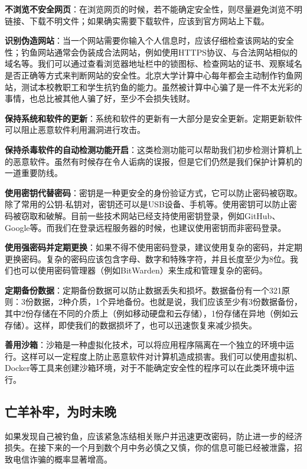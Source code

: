 \documentclass[../main.tex]{subfiles}
\begin{document}
\textbf{不浏览不安全网页}：在浏览网页的时候，若不能确定安全性，则尽量避免浏览不明链接、下载不明文件；如果确实需要下载软件，应该到官方网站上下载。

\textbf{识别伪造网站}：当一个网站需要你输入个人信息时，应该仔细检查该网站的安全性；钓鱼网站通常会伪装成合法网站，例如使用HTTPS协议、与合法网站相似的域名等。我们可以通过查看浏览器地址栏中的锁图标、检查网站的证书、观察域名是否正确等方式来判断网站的安全性。北京大学计算中心每年都会主动制作钓鱼网站，测试本校教职工和学生抗钓鱼的能力。虽然被计算中心骗了是一件不太光彩的事情，也总比被其他人骗了好，至少不会损失钱财。

\textbf{保持系统和软件的更新}：系统和软件的更新有一大部分是安全更新。定期更新软件可以阻止恶意软件利用漏洞进行攻击。

\textbf{保持杀毒软件的自动检测功能开启}：这类检测功能可以帮助我们初步检测计算机上的恶意软件。虽然有时候存在令人诟病的误报，但是它们仍然是我们保护计算机的一道重要防线。

\textbf{使用密钥代替密码}：密钥是一种更安全的身份验证方式，它可以防止密码被窃取。除了常用的公钥-私钥对，密钥还可以是USB设备、手机等。使用密钥可以防止密码被窃取和破解。目前一些技术网站已经支持使用密钥登录，例如GitHub、Google等。而我们在登录远程服务器的时候，也建议使用密钥而非密码登录。

\textbf{使用强密码并定期更换}：如果不得不使用密码登录，建议使用复杂的密码，并定期更换密码。复杂的密码应该包含字母、数字和特殊字符，并且长度至少为8位。我们也可以使用密码管理器（例如BitWarden）来生成和管理复杂的密码。

\textbf{定期备份数据}：定期备份数据可以防止数据丢失和损坏。数据备份有一个321原则：3份数据，2种介质，1个异地备份。也就是说，我们应该至少有3份数据备份，其中2份存储在不同的介质上（例如移动硬盘和云存储），1份存储在异地（例如云存储）。这样，即使我们的数据损坏了，也可以迅速恢复来减少损失。

\textbf{善用沙箱}：沙箱是一种虚拟化技术，可以将应用程序隔离在一个独立的环境中运行。这样可以一定程度上防止恶意软件对计算机造成损害。我们可以使用虚拟机、Docker等工具来创建沙箱环境，对于不能确定安全性的程序可以在此类环境中运行。

\subsection{亡羊补牢，为时未晚}

如果发现自己被钓鱼，应该紧急冻结相关账户并迅速更改密码，防止进一步的经济损失。在接下来的一个月到数个月中务必慎之又慎，你的信息可能已经被泄露，招致电信诈骗的概率显著增高。
\end{document}
